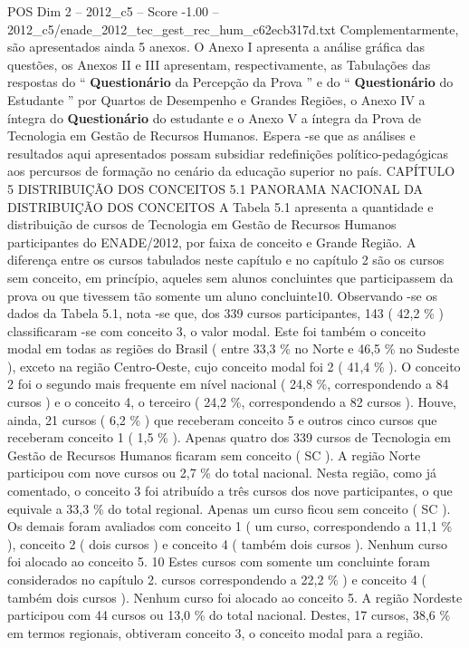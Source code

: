 \begin{textsample}{POS Dim 2 – 2012\_c5 – Score -1.00 – 2012\_c5/enade\_2012\_tec\_gest\_rec\_hum\_c62ecb317d.txt}
Complementarmente, são apresentados ainda 5 anexos.
O Anexo I apresenta a análise gráfica das questões, os Anexos II e III apresentam, respectivamente, as Tabulações das respostas do “ \textbf{Questionário} da Percepção da Prova ” e do “ \textbf{Questionário} do Estudante ” por Quartos de Desempenho e Grandes Regiões, o Anexo IV a íntegra do \textbf{Questionário} do estudante e o Anexo V a íntegra da Prova de Tecnologia em Gestão de Recursos Humanos.
Espera -se que as análises e resultados aqui apresentados possam subsidiar redefinições político-pedagógicas aos percursos de formação no cenário da educação superior no país.
CAPÍTULO 5 DISTRIBUIÇÃO DOS CONCEITOS 5.1 PANORAMA NACIONAL DA DISTRIBUIÇÃO DOS CONCEITOS A Tabela 5.1 apresenta a quantidade e distribuição de cursos de Tecnologia em Gestão de Recursos Humanos participantes do ENADE/2012, por faixa de conceito e Grande Região.
A diferença entre os cursos tabulados neste capítulo e no capítulo 2 são os cursos sem conceito, em princípio, aqueles sem alunos concluintes que participassem da prova ou que tivessem tão somente um aluno concluinte10.
Observando -se os dados da Tabela 5.1, nota -se que, dos 339 cursos participantes, 143 ( 42,2 \% ) classificaram -se com conceito 3, o valor modal.
Este foi também o conceito modal em todas as regiões do Brasil ( entre 33,3 \% no Norte e 46,5 \% no Sudeste ), exceto na região Centro-Oeste, cujo conceito modal foi 2 ( 41,4 \% ).
O conceito 2 foi o segundo mais frequente em nível nacional ( 24,8 \%, correspondendo a 84 cursos ) e o conceito 4, o terceiro ( 24,2 \%, correspondendo a 82 cursos ).
Houve, ainda, 21 cursos ( 6,2 \% ) que receberam conceito 5 e outros cinco cursos que receberam conceito 1 ( 1,5 \% ).
Apenas quatro dos 339 cursos de Tecnologia em Gestão de Recursos Humanos ficaram sem conceito ( SC ).
A região Norte participou com nove cursos ou 2,7 \% do total nacional.
Nesta região, como já comentado, o conceito 3 foi atribuído a três cursos dos nove participantes, o que equivale a 33,3 \% do total regional.
Apenas um curso ficou sem conceito ( SC ).
Os demais foram avaliados com conceito 1 ( um curso, correspondendo a 11,1 \% ), conceito 2 ( dois cursos ) e conceito 4 ( também dois cursos ).
Nenhum curso foi alocado ao conceito 5. 10 Estes cursos com somente um concluinte foram considerados no capítulo 2. cursos correspondendo a 22,2 \% ) e conceito 4 ( também dois cursos ).
Nenhum curso foi alocado ao conceito 5.
A região Nordeste participou com 44 cursos ou 13,0 \% do total nacional.
Destes, 17 cursos, 38,6 \% em termos regionais, obtiveram conceito 3, o conceito modal para a região.

\end{textsample}
